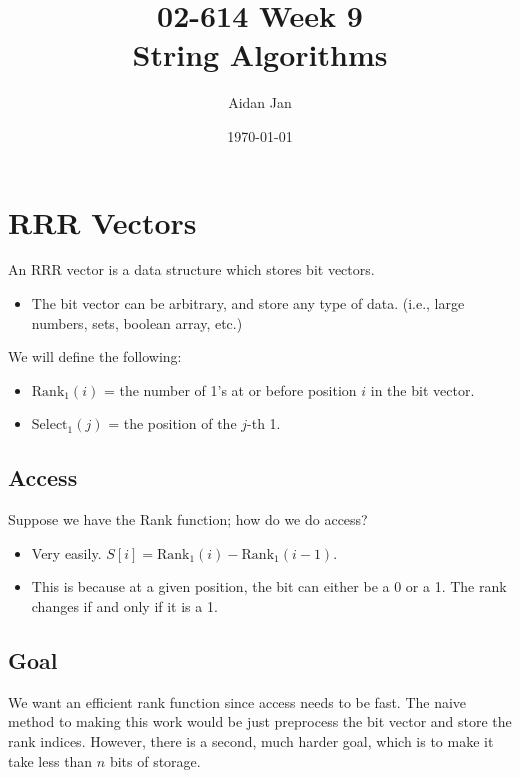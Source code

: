 \documentclass[10pt]{article}
\title{02-614 Week 9 \\ \large{String Algorithms}}
\author{Aidan Jan}
\date{\today}
\newcommand{\rank}{\text{Rank}}
\newcommand{\select}{\text{Select}}
\begin{document}
\maketitle

\section*{RRR Vectors}
An RRR vector is a data structure which stores bit vectors.
\begin{itemize}
    \item The bit vector can be arbitrary, and store any type of data.  (i.e., large numbers, sets, boolean array, etc.)
\end{itemize}
We will define the following:
\begin{itemize}
    \item $\rank_1 (i)$ = the number of 1's at or before position $i$ in the bit vector.
    \item $\select_1(j)$ = the position of the $j$-th 1.
\end{itemize}

\subsection*{Access}
Suppose we have the Rank function; how do we do access?
\begin{itemize}
    \item Very easily.  $S[i] = \rank_1(i) - \rank_1(i - 1)$.
    \item This is because at a given position, the bit can either be a 0 or a 1.  The rank changes if and only if it is a 1.
\end{itemize}

\subsection*{Goal}
We want an efficient rank function since access needs to be fast.  The naive method to making this work would be just preprocess the bit vector and store the rank indices.  However, there is a second, much harder goal, which is to make it take less than $n$ bits of storage.
\end{document}
